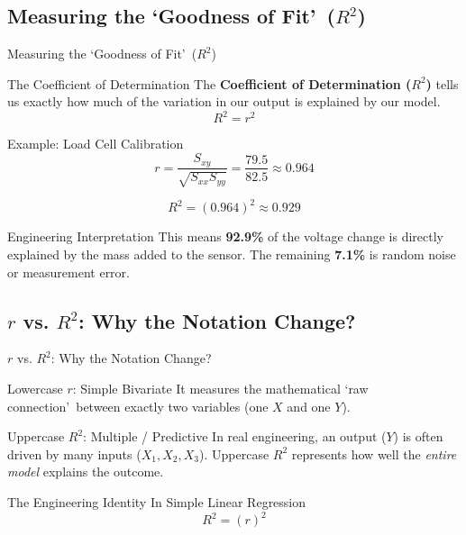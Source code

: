 \subsection{Measuring the \lq Goodness of Fit\rq\ ($R^2$)}
\begin{frame}{Measuring the \lq Goodness of Fit\rq\ ($R^2$)}
    \begin{block}{The Coefficient of Determination}
        The \textbf{Coefficient of Determination ($R^2$)} tells us exactly how much of the variation in our output is explained by our model.
        $$R^2 = r^2$$
    \end{block}

    \begin{block}{Example: Load Cell Calibration}
        $$r = \frac{S_{xy}}{\sqrt{S_{xx}S_{yy}}} = \frac{79.5}{82.5} \approx 0.964$$
        
        $$R^2 = (0.964)^2 \approx 0.929$$
    \end{block}

    \begin{alertblock}{Engineering Interpretation}
        This means \textbf{92.9\%} of the voltage change is directly explained by the mass added to the sensor. The remaining \textbf{7.1\%} is random noise or measurement error.
    \end{alertblock}
\end{frame}

\subsection{$r$ vs. $R^2$: Why the Notation Change?}
\begin{frame}{$r$ vs. $R^2$: Why the Notation Change?}
    \begin{block}{Lowercase $r$: Simple Bivariate}
        It measures the mathematical \lq raw connection\rq\ between exactly two variables (one $X$ and one $Y$).
    \end{block}

    \begin{block}{Uppercase $R^2$: Multiple / Predictive}
      In real engineering, an output ($Y$) is often driven by many inputs ($X_1, X_2, X_3$). Uppercase $R^2$ represents how well the \textit{entire model} explains the outcome.
    \end{block}

    \begin{alertblock}{The Engineering Identity}
        In Simple Linear Regression 
        $$R^2 = (r)^2$$
    \end{alertblock}
\end{frame}


